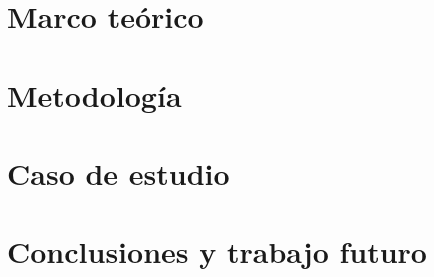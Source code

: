 \documentclass[letterpaper,12pt,oneside]{book} %
\begin{document}
\chapter{Marco teórico}
\label{ch:theorethical_framework}


\chapter{Metodología}
\label{ch:methodology}


\chapter{Caso de estudio}
\label{ch:case_study}


\chapter{Conclusiones y trabajo futuro}
\label{ch:conclusion}




\end{document}
